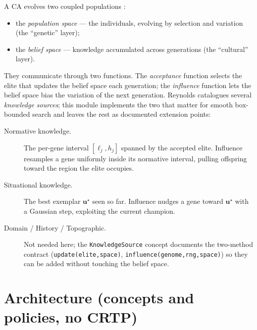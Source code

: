 A CA evolves two coupled populations \cite{Reynolds1994Cultural}:
%
\begin{itemize}
  \item the \emph{population space} --- the individuals, evolving by
        selection and variation (the ``genetic'' layer);
  \item the \emph{belief space} --- knowledge accumulated across
        generations (the ``cultural'' layer).
\end{itemize}
%
They communicate through two functions. The \emph{acceptance} function
selects the elite that updates the belief space each generation; the
\emph{influence} function lets the belief space bias the variation of the
next generation. Reynolds catalogues several \emph{knowledge sources};
this module implements the two that matter for smooth box-bounded search
and leaves the rest as documented extension points:
%
\begin{description}
  \item[Normative knowledge.] The per-gene interval
        \([\ell_j,h_j]\) spanned by the accepted elite. Influence
        resamples a gene uniformly inside its normative interval, pulling
        offspring toward the region the elite occupies.
  \item[Situational knowledge.] The best exemplar
        \(\mathbf{u}^\star\) seen so far. Influence nudges a gene toward
        \(\mathbf{u}^\star\) with a Gaussian step, exploiting the current
        champion.
  \item[Domain / History / Topographic.] Not needed here; the
        \texttt{KnowledgeSource} concept documents the two-method contract
        (\texttt{update(elite,space)}, \texttt{influence(genome,rng,space)})
        so they can be added without touching the belief space.
\end{description}

\section{Architecture (concepts and policies, no CRTP)}

